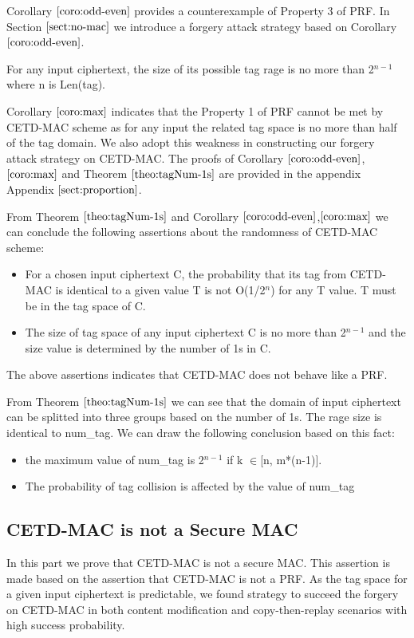 Corollary $\ref{coro:odd-even}$ provides a counterexample of Property 3 of PRF. In Section $\ref{sect:no-mac}$ we introduce a forgery attack strategy based on Corollary $\ref{coro:odd-even}$. 
\begin{corollary} \label{coro:max}
For any input ciphertext, the size of its possible tag rage is no more than 2$^{n-1}$ where n is Len(tag).
\end{corollary}
Corollary $\ref{coro:max}$ indicates that the Property 1 of PRF cannot be met by CETD-MAC scheme as for any input the related tag space is no more than half of the tag domain. We also adopt this weakness in constructing our forgery attack strategy on CETD-MAC.
The proofs of Corollary $\ref{coro:odd-even}$, $\ref{coro:max}$ and Theorem $\ref{theo:tagNum-1s}$ are provided in the appendix Appendix $\ref{sect:proportion}$. 

From Theorem $\ref{theo:tagNum-1s}$ and Corollary $\ref{coro:odd-even}$,$\ref{coro:max}$ we can conclude the following assertions about the randomness of CETD-MAC scheme:
\begin{itemize}
	\item For a chosen input ciphertext C, the probability that its tag from CETD-MAC is identical to a given value T is not O(1/2$^n$) for any T value. T must be in the tag space of C. 
	\item The size of tag space of any input ciphertext C is no more than 2$^{n-1}$ and the size value is determined by the number of 1s in C.
\end{itemize}
The above assertions indicates that CETD-MAC does not behave like a PRF.

From Theorem $\ref{theo:tagNum-1s}$ we can see that the domain of input ciphertext can be splitted into three groups based on the number of 1s. The rage size is identical to num\_tag. We can draw the following conclusion based on this fact:
\begin{itemize}
	\item the maximum value of num\_tag is 2$^{n-1}$ if k $\in$[n, m*(n-1)]. 
	\item The probability of tag collision is affected by the value of num\_tag
\end{itemize}

\subsection{CETD-MAC is not a Secure MAC}\label{sect:no-mac}
In this part we prove that CETD-MAC is not a secure MAC. This assertion is made
based on the assertion that CETD-MAC is not a PRF. As the tag space for a given input ciphertext is predictable, we found strategy to succeed the forgery on CETD-MAC in both content modification and copy-then-replay scenarios with high success probability.

